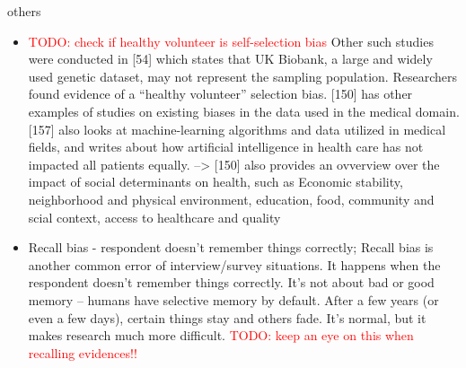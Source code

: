 \documentclass[12pt, a4paper, oneside]{book}   	%
\renewcommand{\todo}[1]{\textcolor{red}{TODO: #1}}
\newif\ifrawcitationactive
\newcommand{\rawcitationstart}{\color{purple}\rawcitationactivetrue}
\begin{document}
			\rawcitationstart
			others
			\begin{itemize}
				\item \todo{check if healthy volunteer is self-selection bias} Other such studies were conducted in [54] which states that UK Biobank, a large and widely used genetic dataset, may not represent the sampling population. Researchers found evidence of a “healthy volunteer” selection bias. [150] has other examples of studies on existing biases in the data used in the medical domain. [157] also looks at machine-learning algorithms and data utilized in medical fields, and writes about how artificial intelligence in health care has not impacted all patients equally.\autocite{Mehrabi_2021} --> [150] also provides an ovverview over the impact of social determinants on health, such as Economic stability, neighborhood and physical environment, education, food, community and scial context, access to healthcare and quality
				\item Recall bias - respondent doesn't remember things correctly; Recall bias is another common error of interview/survey situations. It happens when the respondent doesn’t remember things correctly. It’s not about bad or good memory – humans have selective memory by default. After a few years (or even a few days), certain things stay and others fade. It’s normal, but it makes research much more difficult. \todo{keep an eye on this when recalling evidences!!}
				

\end{itemize}
\end{document}
